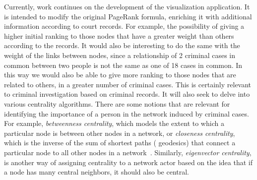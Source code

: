 
Currently, work continues on the development of the visualization application. It is intended to modify the original PageRank formula, enriching it with additional information according to court records. For example, the possibility of giving a higher initial ranking to those nodes that have a greater weight than others according to the records. It would also be interesting to do the same with the weight of the links between nodes, since a relationship of 2 criminal cases in common between two people is not the same as one of 18 cases in common. In this way we would also be able to give more ranking to those nodes that are related to others, in a greater number of criminal cases. This is certainly relevant to criminal investigation based on criminal records.
It will also seek to delve into various centrality algorithms. There are some notions that are relevant for identifying the importance of a person in the network induced by criminal cases. For example, \textit{betweenness centrality}, which models the extent to which a particular node is between other nodes in a network, or \textit{closeness centrality}, which is the inverse of the sum of shortest paths ( geodesics) that connect a particular node to all other nodes in a network~\cite{newman2005measure}. Similarly, \textit{eigenvector centrality}, is another way of assigning centrality to a network actor based on the idea that if a node has many central neighbors, it should also be central.
